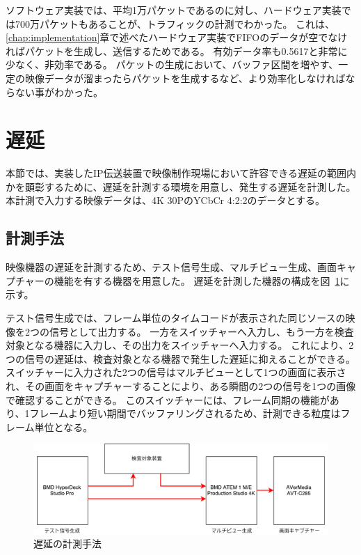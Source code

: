ソフトウェア実装では、平均1万パケットであるのに対し、ハードウェア実装では700万パケットもあることが、トラフィックの計測でわかった。
これは、\ref{chap:implementation}章で述べたハードウェア実装でFIFOのデータが空でなければパケットを生成し、送信するためである。
有効データ率も0.5617と非常に少なく、非効率である。
パケットの生成において、バッファ区間を増やす、一定の映像データが溜まったらパケットを生成するなど、より効率化しなければならない事がわかった。

\section{遅延}

本節では、実装したIP伝送装置で映像制作現場において許容できる遅延の範囲内かを顕彰するために、遅延を計測する環境を用意し、発生する遅延を計測した。
本計測で入力する映像データは、4K 30PのYCbCr 4:2:2のデータとする。

\subsection{計測手法}

映像機器の遅延を計測するため、テスト信号生成、マルチビュー生成、画面キャプチャーの機能を有する機器を用意した。
遅延を計測した機器の構成を図~\ref{fig:evaluate-diagram}に示す。

テスト信号生成では、フレーム単位のタイムコードが表示された同じソースの映像を2つの信号として出力する。
一方をスイッチャーへ入力し、もう一方を検査対象となる機器に入力し、その出力をスイッチャーへ入力する。
これにより、2つの信号の遅延は、検査対象となる機器で発生した遅延に抑えることができる。
スイッチャーに入力された2つの信号はマルチビューとして1つの画面に表示され、その画面をキャプチャーすることにより、ある瞬間の2つの信号を1つの画像で確認することができる。
このスイッチャーには、フレーム同期の機能があり、1フレームより短い期間でバッファリングされるため、計測できる粒度はフレーム単位となる。

\begin{figure}[htbp]
  \begin{center}
    \includegraphics[bb=0 0 697 212,width=15cm]{img/evaluate-diagram.pdf}
  \end{center}
  \caption{遅延の計測手法}
  \label{fig:evaluate-diagram}
\end{figure}

